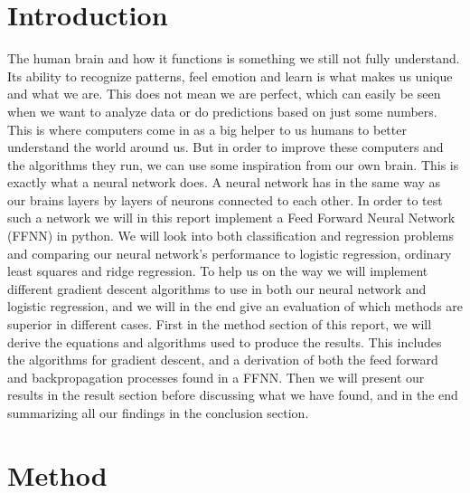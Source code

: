 \documentclass[11pt]{article}
\begin{document}
\section{Introduction}
The human brain and how it functions is something we still not fully understand\cite{allen}. Its ability to recognize patterns, feel emotion and learn is what makes us unique and what we are. This does not mean we are perfect, which can easily be seen when we want to analyze data or do predictions based on just some numbers. This is where computers come in as a big helper to us humans to better understand the world around us. But in order to improve these computers and the algorithms they run, we can use some inspiration from our own brain. This is exactly what a neural network does. A neural network has in the same way as our brains layers by layers of neurons connected to each other. In order to test such a network we will in this report implement a Feed Forward Neural Network (FFNN) in python. We will look into both classification and regression problems and comparing our neural network's performance to logistic regression, ordinary least squares and ridge regression. To help us on the way we will implement different gradient descent algorithms to use in both our neural network and logistic regression, and we will in the end give an evaluation of which methods are superior in different cases. First in the method section of this report, we will derive the equations and algorithms used to produce the results. This includes the algorithms for gradient descent, and a derivation of both the feed forward and backpropagation processes found in a FFNN. Then we will present our results in the result section before discussing what we have found, and in the end summarizing all our findings in the conclusion section.
\section{Method}
\end{document}
